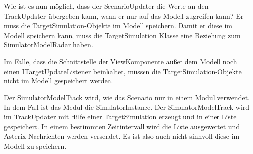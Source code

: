 Wie ist es nun möglich, dass der ScenarioUpdater die Werte an den TrackUpdater übergeben kann, wenn er nur auf das Modell zugreifen kann? Er muss die TargetSimulation-Objekte im Modell speichern. Damit er diese im Modell speichern kann, muss die TargetSimulation Klasse eine Beziehung zum SimulatorModelRadar haben.

Im Falle, dass die Schnittstelle der ViewKomponente außer dem Modell noch einen ITargetUpdateListener beinhaltet, müssen die TargetSimulation-Objekte nicht im Modell gespeichert werden.

Der SimulatorModelTrack wird, wie das Scenario nur in einem Modul verwendet. In dem Fall ist das Modul die SimulatorInstance. Der SimulatorModelTrack wird im TrackUpdater mit Hilfe einer TargetSimulation erzeugt und in einer Liste gespeichert. In einem bestimmten Zeitintervall wird die Liste ausgewertet und Asterix-Nachrichten werden versendet. Es ist also auch nicht sinnvoll diese im Modell zu speichern.
